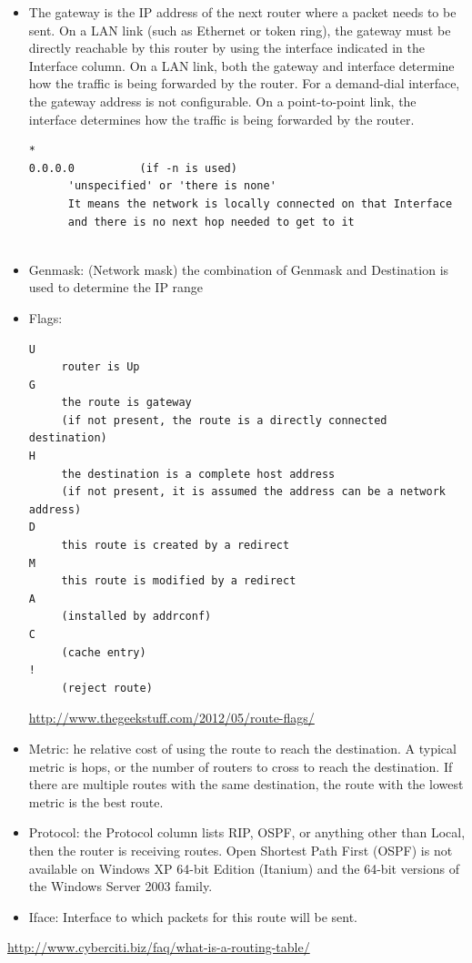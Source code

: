 \begin{itemize}
  \item The gateway is the IP address of the next router where a packet needs to be
sent. On a LAN link (such as Ethernet or token ring), the gateway must be
directly reachable by this router by using the interface indicated in the Interface
column. On a LAN link, both the gateway and interface determine how the traffic
is being forwarded by the router. For a demand-dial interface, the gateway
address is not configurable. On a point-to-point link, the interface determines
how the traffic is being forwarded by the router.

\begin{verbatim}
*                
0.0.0.0          (if -n is used)
      'unspecified' or 'there is none'
      It means the network is locally connected on that Interface
      and there is no next hop needed to get to it
      
\end{verbatim}
  \item Genmask: (Network mask) the combination of Genmask and Destination is
  used to determine the IP range
  
  \item Flags: 
\begin{verbatim}
U 
     router is Up
G
     the route is gateway
     (if not present, the route is a directly connected destination)
H     
     the destination is a complete host address
     (if not present, it is assumed the address can be a network address)
D     
     this route is created by a redirect
M     
     this route is modified by a redirect
A 
     (installed by addrconf)
C 
     (cache entry)
! 
     (reject route)     
\end{verbatim}
 \url{http://www.thegeekstuff.com/2012/05/route-flags/} 
  
  \item Metric: he relative cost of using the route to reach the destination. A
  typical metric is hops, or the number of routers to cross to reach the
  destination. If there are multiple routes with the same destination, the route
  with the lowest metric is the best route.  
  
  \item Protocol: the Protocol column lists RIP, OSPF, or anything other than
  Local, then the router is receiving routes. Open Shortest Path First (OSPF) is
  not available on Windows XP 64-bit Edition (Itanium) and the 64-bit versions
  of the Windows Server 2003 family.  
  
  \item Iface: Interface to which packets for this route will be sent.
\end{itemize}
\url{http://www.cyberciti.biz/faq/what-is-a-routing-table/}

